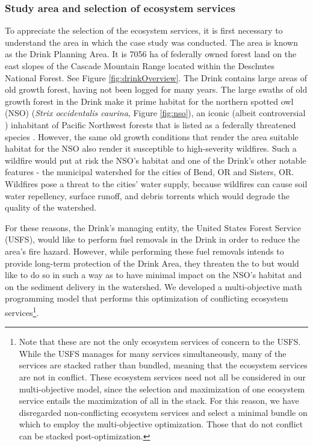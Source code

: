 \subsubsection{Study area and selection of ecosystem services}
\label{subsec:studyArea}
To appreciate the selection of the ecosystem services, it is first necessary to understand the area in which the case study was conducted. The area is known as the Drink Planning Area. It is 7056 ha of federally owned forest land on the east slopes of the Cascade Mountain Range located within the Deschutes National Forest. See Figure \ref{fig:drinkOverview}. The Drink contains large areas of old growth forest, having not been logged for many years. The large swaths of old growth forest in the Drink make it prime habitat for the northern spotted owl (NSO) (\textit{Strix occidentalis caurina}, Figure \ref{fig:nso}), an iconic (albeit controversial \cite{simberloff1998flagships}) inhabitant of Pacific Northwest forests that is listed as a federally threatened species \cite{congress1973endangered}. However, the same old growth conditions that render the area suitable habitat for the NSO also render it susceptible to high-severity wildfires. Such a wildfire would put at risk the NSO's habitat \cite{courtney2004scientific} and one of the Drink's other notable features - the municipal watershed for the cities of Bend, OR and Sisters, OR. Wildfires pose a threat to the cities' water supply, because wildfires can cause soil water repellency, surface runoff, and debris torrents \cite{ice2004effects} which would degrade the quality of the watershed.

For these reasons, the Drink's managing entity, the United States Forest Service (USFS), would like to perform fuel removals in the Drink in order to reduce the area's fire hazard. However, while performing these fuel removals intends to provide long-term protection of the Drink Area, they threaten the  to  but would like to do so in such a way as to have minimal impact on the NSO's habitat and on the sediment delivery in the watershed. We developed a multi-objective math programming model that performs this optimization of conflicting ecosystem services\footnote{Note that these are not the only ecosystem services of concern to the USFS. While the USFS manages for many services simultaneously, many of the services are stacked rather than bundled, meaning that the ecosystem services are not in conflict. These ecosystem services need not all be considered in our multi-objective model, since the selection and maximization of one ecosystem service entails the maximization of all in the stack. For this reason, we have disregarded non-conflicting ecosystem services and select a minimal bundle on which to employ the multi-objective optimization. Those that do not conflict can be stacked post-optimization.}.

